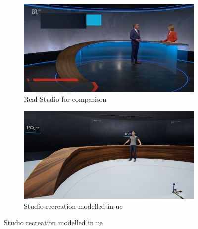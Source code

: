 \documentclass[
  a4paper,  %
  twoside,  %
  bibliography=totoc,
  headsepline,
  cleardoublepage=empty,
  parskip=half,
  draft=false
]{scrbook}
\begin{document}
\begin{figure}[h]
  \centering
  \begin{subfigure}{0.45\textwidth}
    \includegraphics[width=\linewidth]{graphics/unreal-engine/studio/Studio-real.png}
    \caption{Real Studio for comparison}
  \end{subfigure}
  \begin{subfigure}{0.45\textwidth}
    \includegraphics[width=\linewidth]{graphics/unreal-engine/studio/Studio-Comparison.png}
    \caption{Studio recreation modelled in \gls{ue}}
  \end{subfigure}


\end{figure}
\end{document}
